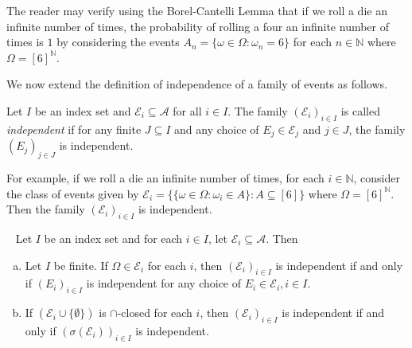 The reader may verify using the Borel-Cantelli Lemma that if we roll a die an infinite number of times, the probability of rolling a four an infinite number of times is $1$ by considering the events $A_n = \{\omega\in\Omega:\omega_n=6\}$ for each $n\in\mathbb{N}$ where $\Omega=[6]^\mathbb{N}$.

\vspace{2mm}
We now extend the definition of independence of a family of events as follows.

\begin{definition}
\label{independence of classes of events}
    Let $I$ be an index set and $\mathcal{E}_i\subseteq\mathcal{A}$ for all $i\in I$. The family $(\mathcal{E}_i)_{i\in I}$ is called \textit{independent} if for any finite $J\subseteq I$ and any choice of $E_j\in\mathcal{E}_j$ and $j\in J$, the family $(E_j)_{j\in J}$ is independent.
\end{definition}

For example, if we roll a die an infinite number of times, for each $i\in\mathbb{N}$, consider the class of events given by $\mathcal{E}_i=\{\{\omega\in\Omega:\omega_i\in A\}:A\subseteq[6]\}$
where $\Omega=[6]^\mathbb{N}$. Then the family $(\mathcal{E}_i)_{i\in I}$ is independent.

\begin{theorem}
\label{independent set classes subset}
~
    Let $I$ be an index set and for each $i\in I$, let $\mathcal{E}_i\subseteq \mathcal{A}$. Then
    \begin{enumerate}[(a)]
        \item Let $I$ be finite. If $\Omega\in\mathcal{E}_i$ for each $i$, then $(\mathcal{E}_i)_{i\in I}$ is independent if and only if $(E_i)_{i\in I}$ is independent for any choice of $E_i\in\mathcal{E}_i, i\in I$.
        
        \item If $(\mathcal{E}_i\cup\{\emptyset\})$ is $\cap$-closed for each $i$, then $(\mathcal{E}_i)_{i\in I}$ is independent if and only if $(\sigma(\mathcal{E}_i))_{i\in I}$ is independent.
        
    \end{enumerate}
\end{theorem}

